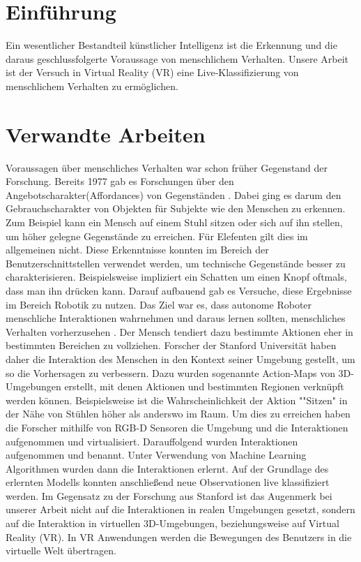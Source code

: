 
\section{Einführung}

Ein wesentlicher Bestandteil künstlicher Intelligenz ist die Erkennung und die daraus geschlussfolgerte Voraussage von menschlichem Verhalten. Unsere Arbeit ist der Versuch in Virtual Reality (VR) eine Live-Klassifizierung von menschlichem Verhalten zu ermöglichen.


\section{Verwandte Arbeiten}
Voraussagen über menschliches Verhalten war schon früher Gegenstand der Forschung. Bereits 1977 gab es Forschungen über den Angebotscharakter(Affordances) von Gegenständen \cite{gibson}. Dabei ging es darum den Gebrauchscharakter
von Objekten für Subjekte wie den Menschen zu erkennen. Zum Beispiel kann ein Mensch auf einem Stuhl sitzen oder sich auf ihn stellen, um höher gelegne Gegenstände zu erreichen. Für Elefenten gilt dies im allgemeinen nicht. Diese Erkenntnisse konnten im Bereich der Benutzerschnittstellen verwendet werden, um technische Gegenstände besser zu charakterisieren. Beispielsweise impliziert ein Schatten um einen Knopf oftmals, dass man ihn drücken kann.
\newline
Darauf aufbauend gab es Versuche, diese Ergebnisse im Bereich Robotik zu nutzen. Das Ziel war es, dass autonome Roboter menschliche
Interaktionen wahrnehmen und daraus lernen sollten, menschliches Verhalten vorherzusehen \cite{fritz, montesano,stark, sun}.
\newline
Der Mensch tendiert dazu bestimmte Aktionen eher in bestimmten Bereichen zu vollziehen. Forscher der Stanford Universität haben daher
die Interaktion des Menschen in den Kontext seiner Umgebung gestellt, um so die Vorhersagen zu verbessern. Dazu wurden sogenannte
Action-Maps von 3D-Umgebungen erstellt, mit denen Aktionen und bestimmten Regionen verknüpft werden können. Beispielsweise ist
die Wahrscheinlichkeit der Aktion ""Sitzen" in der Nähe von Stühlen höher als anderswo im Raum. Um dies zu erreichen haben die Forscher mithilfe von RGB-D Sensoren die Umgebung und die Interaktionen aufgenommen und virtualisiert. Darauffolgend wurden Interaktionen aufgenommen und benannt. Unter Verwendung von Machine Learning Algorithmen wurden dann die Interaktionen erlernt. Auf der Grundlage des erlernten Modells konnten anschließend neue Observationen live klassifiziert werden.
\newline
Im Gegensatz zu der Forschung aus Stanford ist das Augenmerk bei unserer Arbeit nicht auf die Interaktionen in realen Umgebungen gesetzt, sondern auf die Interaktion in virtuellen 3D-Umgebungen, beziehungsweise auf Virtual Reality (VR). In VR Anwendungen werden die Bewegungen des Benutzers in die virtuelle Welt übertragen.



